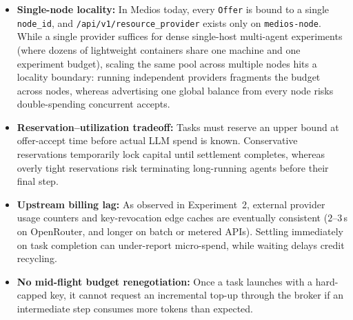 \documentclass[11pt]{article}
\begin{document}
\begin{itemize}
  \item \textbf{Single-node locality:} In Medios today, every \texttt{Offer} is bound to a single \texttt{node\_id}, and \texttt{/api/v1/resource\_provider} exists only on \texttt{medios-node}. While a single provider suffices for dense single-host multi-agent experiments (where dozens of lightweight containers share one machine and one experiment budget), scaling the same pool across multiple nodes hits a locality boundary: running independent providers fragments the budget across nodes, whereas advertising one global balance from every node risks double-spending concurrent accepts.
  \item \textbf{Reservation--utilization tradeoff:} Tasks must reserve an upper bound at offer-accept time before actual LLM spend is known. Conservative reservations temporarily lock capital until settlement completes, whereas overly tight reservations risk terminating long-running agents before their final step.
  \item \textbf{Upstream billing lag:} As observed in Experiment~2, external provider usage counters and key-revocation edge caches are eventually consistent ($2\text{--}3$\,s on OpenRouter, and longer on batch or metered APIs). Settling immediately on task completion can under-report micro-spend, while waiting delays credit recycling.
  \item \textbf{No mid-flight budget renegotiation:} Once a task launches with a hard-capped key, it cannot request an incremental top-up through the broker if an intermediate step consumes more tokens than expected.
\end{itemize}
\end{document}
